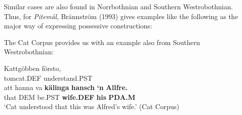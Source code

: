 
\ea
{}
\z 
\z

Similar cases are also found in Norrbothnian and Southern Westrobothnian. Thus, for \textit{Pitemål}, Brännström (1993) gives examples like the following as the major way of expressing possessive constructions:


\ea\label{}

\z 
\z

The Cat Corpus provides us with an example also from Southern Westrobothnian:


\ea\label{}
\gll Kattgöbben  försto,\\
tomcat.DEF  understand.PST\\
\gll att  hanna  va  \textbf{kälinga} \textbf{hansch} \textbf{‘n} \textbf{Allfre.}\\
that  DEM  be.PST  \textbf{wife.DEF} \textbf{his} \textbf{PDA.M} \\
\glt ‘Cat understood that this was Alfred’s wife.’ (Cat Corpus)
\z

